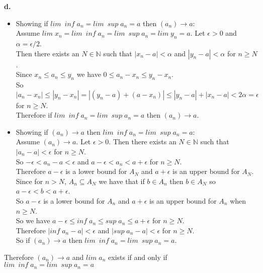 \documentclass{article}
\begin{document}
\newpage
{\Large \textbf{d.}}
\begin{center}
    \doublespacing
    \begin{itemize}
        \item Showing if $lim\;\: inf\;a_n = lim\;\: sup\;a_n = a$ then $(a_n)\rightarrow a$:
        \\Assume $lim\; x_n = lim\;\: inf\;a_n = lim\;\: sup\;a_n = lim\; y_n = a$. Let $\epsilon > 0$ and $\alpha =\epsilon / 2$.
        \\Then there exists an $N\in\mathbb{N}$ such that $|x_n - a| <\alpha$ and $|y_n - a| <\alpha$ for $n\geq N$.
        \\Since $x_n\leq a_n\leq y_n$ we have $0\leq a_n - x_n\leq y_n - x_n$.
        \\So $|a_n - x_n|\leq |y_n - x_n| = |(y_n - a) + (a - x_n)|\leq |y_n - a| + |x_n - a| < 2\alpha =\epsilon$ for $n\geq N$.
        \\Therefore if $lim\;\: inf\;a_n = lim\;\: sup\;a_n = a$ then $(a_n)\rightarrow a$.
        \item Showing if $(a_n)\rightarrow a$ then $lim\;\: inf\;a_n = lim\;\: sup\;a_n = a$:
        \\Assume $(a_n)\rightarrow a$. Let $\epsilon > 0$. Then there exists an $N\in\mathbb{N}$ such that $|a_n - a| <\epsilon$ for $n\geq N$.
        \\So $-\epsilon < a_n - a <\epsilon$ and $a -\epsilon < a_n < a +\epsilon$ for $n\geq N$.
        \\Therefore $a -\epsilon$ is a lower bound for $A_N$ and $a +\epsilon$ is an upper bound for $A_N$.
        \\Since for $n > N$, $A_n\subseteq A_N$ we have that if $b\in A_n$ then $b\in A_N$ so $a -\epsilon < b < a +\epsilon$.
        \\So $a -\epsilon$ is a lower bound for $A_n$ and $a +\epsilon$ is an upper bound for $A_n$ when $n\geq N$.
        \\So we have $a -\epsilon\leq inf\;a_n\leq sup\;a_n\leq a +\epsilon$ for $n\geq N$.
        \\Therefore $|inf\;a_n - a| <\epsilon$ and $|sup\;a_n - a| <\epsilon$ for $n\geq N$.
        \\So if $(a_n)\rightarrow a$ then $lim\;\: inf\;a_n = lim\;\: sup\;a_n = a$.
    \end{itemize}
    Therefore $(a_n)\rightarrow a$ and $lim\;a_n$ exists if and only if $lim\;\: inf\;a_n = lim\;\: sup\;a_n = a$ \qedsymbol
\end{center}
\end{document}
